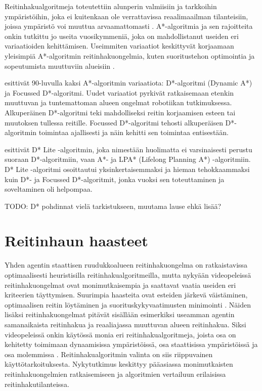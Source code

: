 \documentclass[utf8]{gradu3}
\begin{document}
Reitinhakualgoritmeja toteutettiin alunperin valmiisiin ja tarkkoihin ympäristöihin, joka ei kuitenkaan ole verrattavissa reaalimaailman tilanteisiin, joissa ympäristö voi muuttua arvaamattomasti \parencite{lawande2022systematic}. A*-algoritmia ja sen rajoitteita onkin tutkittu jo useita vuosikymmeniä, joka on mahdollistanut useiden eri variaatioiden kehittämisen. Useimmiten variaatiot keskittyvät korjaamaan yleisimpiä A*-algoritmin reitinhakuongelmia, kuten suoritustehon optimointia ja sopeutumista muuttuviin alueisiin \parencite{stentz1994optimal}.

\textcite{stentz1994optimal,stentz1995focussed} esittivät 90-luvulla kaksi A*-algoritmin variaatiota: D*-algoritmi (Dynamic A*) ja Focussed D*-algoritmi. Uudet variaatiot pyrkivät ratkaisemaan etenkin muuttuvan ja tuntemattoman alueen ongelmat robotiikan tutkimuksessa. Alkuperäinen D*-algoritmi teki mahdolliseksi reitin korjaamisen esteen tai muutoksen tullessa reitille. Focussed D*-algoritmi tehosti alkuperäisen D*-algoritmin toimintaa ajallisesti ja näin kehitti sen toimintaa entisestään.

\textcite{koenig2005fast} esittivät D* Lite -algoritmin, joka nimestään huolimatta ei varsinaisesti perustu suoraan D*-algoritmiin, vaan A*- ja LPA* (Lifelong Planning A*) -algoritmiin. D* Lite -algoritmi osoittautui yksinkertaisemmaksi ja hieman tehokkaammaksi kuin D*- ja Focussed D*-algoritmit, jonka vuoksi sen toteuttaminen ja soveltaminen oli helpompaa.

TODO: D* pohdinnat vielä tarkistukseen, muutama lause ehkä lisää?

\section{Reitinhaun haasteet}

Yhden agentin staattisen ruudukkoalueen reitinhakuongelma on ratkaistavissa optimaalisesti heuristisilla reitinhakualgoritmeilla, mutta nykyään videopeleissä reitinhakuongelmat ovat monimutkaisempia ja saattavat vaatia useiden eri kriteerien täyttymisen. Suurimpia haasteita ovat esteiden järkevä väistäminen, optimaalisen reitin löytäminen ja suorituskykyvaatimusten minimointi \parencite{abd2015comprehensive,cui2011based}. Näiden lisäksi reitinhakuongelmat pitävät sisällään esimerkiksi useamman agentin samanaikaista reitinhakua ja reaaliajassa muuttuvan alueen reitinhakua. Siksi videopeleissä onkin käytössä monia eri reitinhakualgoritmeja, joista osa on kehitetty toimimaan dynaamisissa ympäristöissä, osa staattisissa ympäristöissä ja osa molemmissa \parencite{lawande2022systematic}. Reitinhakualgoritmin valinta on siis riippuvainen käyttötarkoituksesta. Nykytutkimus keskittyy pääasiassa monimutkaisten reitinhakuongelmien ratkaisemiseen ja algoritmien vertailuun erilaisissa reitinhakutilanteissa.
\end{document}
